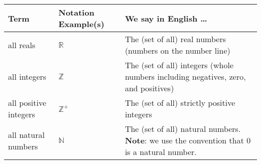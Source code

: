 
\begin{center}
\begin{tabular}{|llp{9.8cm}|}
\hline
{\bf Term} & {\bf Notation Example(s)} & {\bf We say in English \ldots } \\
\hline
all reals & $\mathbb{R}$ & The (set of all) real numbers (numbers on the number line)\\
all integers & $\mathbb{Z}$ & The (set of all) integers (whole numbers including negatives, zero, and positives) \\
all positive integers & $\mathbb{Z}^+$ & The (set of all) strictly positive integers \\
all natural numbers & $\mathbb{N}$ & The (set of all) natural numbers. {\bf Note}: we use the convention that $0$ is a natural number. \\

\end{tabular}
\end{center}
